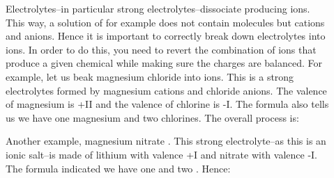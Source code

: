 \documentclass[main.tex]{subfiles} %
\begin{document}
\begin{description}
\item[] Electrolytes--in particular strong electrolytes--dissociate producing ions. This way, a solution of for example  does not contain  molecules but  cations and  anions. Hence it is important to  correctly break down electrolytes into ions. In order to do this, you need to revert the combination of ions that produce a given chemical while making sure the charges are balanced. For example, let us beak magnesium chloride  into ions. This is a strong electrolytes formed by magnesium cations and chloride anions. The valence of magnesium is +II and the valence of chlorine is -I. The  formula also tells us we have one magnesium and two chlorines. The overall process is:
\begin{center}\end{center}
Another example, magnesium nitrate . This strong electrolyte--as this is an ionic salt--is made of lithium with valence +I and nitrate with valence -I. The formula indicated we have one  and two . Hence:
\begin{center}\end{center}


\end{description}
\end{document}
